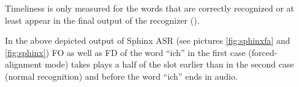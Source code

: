Timeliness is only measured for the words that are correctly recognized or
at least appear in the final output of the recognizer  (\parencite
{Baumann2016}).

In the above depicted output of Sphinx ASR  (see pictures \ref {fig:sphinxfa}
and \ref {fig:sphinx}) FO as well as FD of the word ``ich''  in the first case (forced-alignment mode)
takes plays a half of the slot earlier than in the second case (normal
recognition) and before the word ``ich'' ends in audio. 





 

 